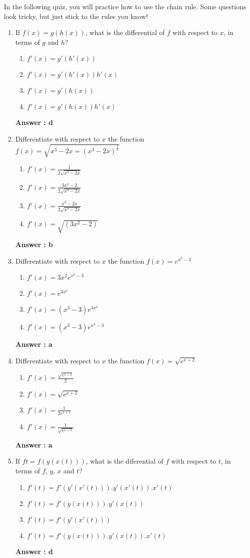 \documentclass{book}
\begin{document}
In the following quiz, you will practice how to use the chain rule. Some
questions look tricky, but just stick to the rules you know!
\begin{enumerate}
	\item If $f(x) = g(h(x))$, what is the differential of $f$ with respect to $x$, in terms of $g$ and $h$?
	\begin{enumerate}
		\item $f'(x) = g'(h'(x))$
		\item $f'(x) = g'(h'(x))h'(x)$
		\item $f'(x) = g'(h(x))$
		\item $f'(x) = g'(h(x))h'(x)$
	\end{enumerate}
\textbf{Answer : d} 
\\
	\item Differentiate with respect to $x$ the function
	$f(x) = \sqrt{x^3 - 2x = (x^3 - 2x)^\frac{1}{2}}$
	\begin{enumerate}
		\item $f'(x) = \frac{1}{2\sqrt{x^3 - 2x}}$
		\item $f'(x) = \frac{3x^2 - 2}{2\sqrt{x^3 - 2x}}$
		\item $f'(x) = \frac{x^3 - 2x}{2\sqrt{x^3 - 2x}}$
		\item $f'(x) = \sqrt{(3x^2 - 2)}$
	\end{enumerate}
\textbf{Answer : b} 
\\
	\item Differentiate with respect to $x$ the function $f(x) = e^{x^3-3}$
	\begin{enumerate}
		\item $f'(x) = 3x^2e^{x^3-3}$
		\item $f'(x) = e^{3x^2}$
		\item $f'(x) = (x^3-3)e^{3x^2}$
		\item $f'(x) = (x^3-3)e^{x^3-3}$
	\end{enumerate}
\textbf{Answer : a} 
\\
	\item Differentiate with respect to $x$ the function $f(x) = \sqrt{e^{x+2}}$
	\begin{enumerate}
		\item $f'(x) = \frac{\sqrt{e^{x+2}}}{2}$
		\item $f'(x) = \sqrt{e^{x+2}}$
		\item $f'(x) = \frac{1}{2e^{x+2}}$
		\item $f'(x) = \frac{1}{\sqrt{e^{x+2}}}$
	\end{enumerate}
\textbf{Answer : a} 
\\
	\item If $f{t} = f(y(x(t)))$, what is the diferential of $f$ with respect to $t$, in terms of $f$, $y$, $x$ and $t$?
	\begin{enumerate}
		\item $f'(t) = f'(y'(x'(t))).y'(x'(t)).x'(t)$
		\item $f'(t) = f'(y(x(t))).y'(x(t))$
		\item $f'(t) = f'(y'(x'(t)))$
		\item $f'(t) = f'(y(x(t))).y'(x(t)).x'(t)$
	\end{enumerate}
\textbf{Answer : d} 
\end{enumerate}
\end{document}
